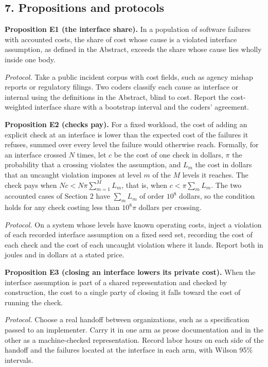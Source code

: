 \documentclass[
  10pt,
]{article}
\begin{document}
\subsection{7. Propositions and
protocols}\label{propositions-and-protocols}

\textbf{Proposition E1 (the interface share).} In a population of
software failures with accounted costs, the share of cost whose cause is
a violated interface assumption, as defined in the Abstract, exceeds the
share whose cause lies wholly inside one body.

\emph{Protocol.} Take a public incident corpus with cost fields, such as
agency mishap reports or regulatory filings. Two coders classify each
cause as interface or internal using the definitions in the Abstract,
blind to cost. Report the cost-weighted interface share with a bootstrap
interval and the coders' agreement.

\textbf{Proposition E2 (checks pay).} For a fixed workload, the cost of
adding an explicit check at an interface is lower than the expected cost
of the failures it refuses, summed over every level the failure would
otherwise reach. Formally, for an interface crossed \(N\) times, let
\(c\) be the cost of one check in dollars, \(\pi\) the probability that
a crossing violates the assumption, and \(L_m\) the cost in dollars that
an uncaught violation imposes at level \(m\) of the \(M\) levels it
reaches. The check pays when \(N c < N \pi \sum_{m=1}^{M} L_m\), that
is, when \(c < \pi \sum_m L_m\). The two accounted cases of Section 2
have \(\sum_m L_m\) of order \(10^8\) dollars, so the condition holds
for any check costing less than \(10^8 \pi\) dollars per crossing.

\emph{Protocol.} On a system whose levels have known operating costs,
inject a violation of each recorded interface assumption on a fixed seed
set, recording the cost of each check and the cost of each uncaught
violation where it lands. Report both in joules and in dollars at a
stated price.

\textbf{Proposition E3 (closing an interface lowers its private cost).}
When the interface assumption is part of a shared representation and
checked by construction, the cost to a single party of closing it falls
toward the cost of running the check.

\emph{Protocol.} Choose a real handoff between organizations, such as a
specification passed to an implementer. Carry it in one arm as prose
documentation and in the other as a machine-checked representation.
Record labor hours on each side of the handoff and the failures located
at the interface in each arm, with Wilson 95\% intervals.
\end{document}
